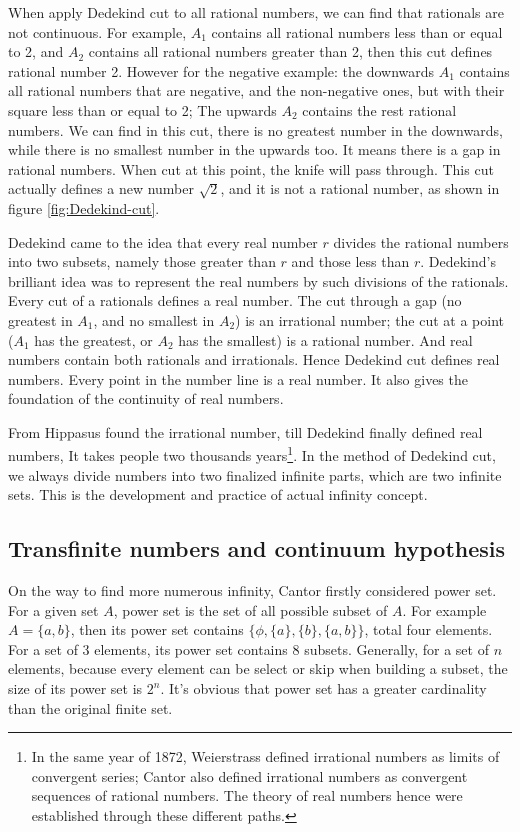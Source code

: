\documentclass{article}
\begin{document}
When apply Dedekind cut to all rational numbers, we can find that rationals are not continuous. For example, $A_1$ contains all rational numbers less than or equal to 2, and $A_2$ contains all rational numbers greater than 2, then this cut defines rational number 2. However for the negative example: the downwards $A_1$ contains all rational numbers that are negative, and the non-negative ones, but with their square less than or equal to 2; The upwards $A_2$ contains the rest rational numbers. We can find in this cut, there is no greatest number in the downwards, while there is no smallest number in the upwards too. It means there is a gap in rational numbers. When cut at this point, the knife will pass through. This cut actually defines a new number $\sqrt{2}$, and it is not a rational number, as shown in figure \ref{fig:Dedekind-cut}.

Dedekind came to the idea that every real number $r$ divides the rational numbers into two subsets, namely those greater than $r$ and those less than $r$. Dedekind's brilliant idea was to represent the real numbers by such divisions of the rationals. Every cut of a rationals defines a real number. The cut through a gap (no greatest in $A_1$, and no smallest in $A_2$) is an irrational number; the cut at a point ($A_1$ has the greatest, or $A_2$ has the smallest) is a rational number. And real numbers contain both rationals and irrationals. Hence Dedekind cut defines real numbers. Every point in the number line is a real number. It also gives the foundation of the continuity of real numbers.

From Hippasus found the irrational number, till Dedekind finally defined real numbers, It takes people two thousands years\footnote{In the same year of 1872, Weierstrass defined irrational numbers as limits of convergent series; Cantor also defined irrational numbers as convergent sequences of rational numbers. The theory of real numbers hence were established through these different paths.}. In the method of Dedekind cut, we always divide numbers into two finalized infinite parts, which are two infinite sets. This is the development and practice of actual infinity concept.

\subsection{Transfinite numbers and continuum hypothesis}
On the way to find more numerous infinity, Cantor firstly considered power set. For a given set $A$, power set is the set of all possible subset of $A$. For example $A = \{a, b\}$, then its power set contains $\{\phi, \{a\}, \{b\}, \{a, b\}\}$, total four elements. For a set of 3 elements, its power set contains 8 subsets. Generally, for a set of $n$ elements, because every element can be select or skip when building a subset, the size of its power set is $2^n$. It's obvious that power set has a greater cardinality than the original finite set.
\end{document}
